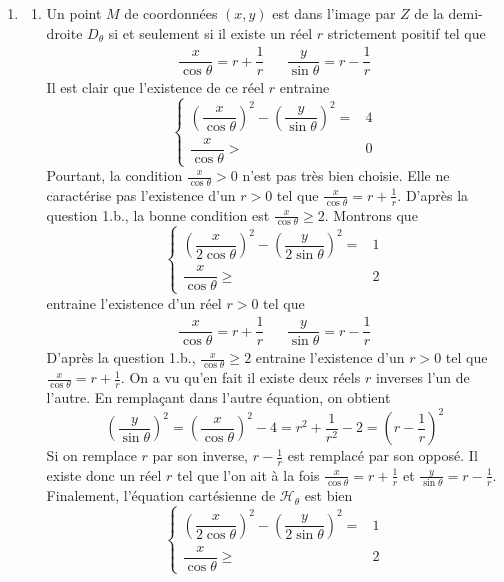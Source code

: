 \begin{enumerate}
\item 
\begin{enumerate}
 \item Un point $M$ de coordonnées $(x,y)$ est dans l'image par $Z$ de la demi-droite $D_\theta$ si et seulement si il existe un réel $r$ strictement positif tel que
\begin{align*}
 \dfrac{x}{\cos \theta}=r+\dfrac{1}{r} & & \dfrac{y}{\sin \theta}=r-\dfrac{1}{r}
\end{align*}
Il est clair que l'existence de ce réel $r$ entraine
\begin{displaymath}
 \left\lbrace 
\begin{aligned}
 \left( \dfrac{x}{\cos \theta}\right)^2 - \left( \dfrac{y}{\sin \theta}\right)^2 =& 4 \\
  \dfrac{x}{\cos \theta} >& 0
\end{aligned}
\right. 
\end{displaymath}
Pourtant, la condition $\frac{x}{\cos \theta} > 0$ n'est pas très bien choisie. Elle ne caractérise pas l'existence d'un $r>0$ tel que $\frac{x}{\cos \theta}=r+\frac{1}{r}$.\newline
D'après la question 1.b., la bonne condition est $\frac{x}{\cos \theta}\geq2$.\newline
Montrons que
\begin{displaymath}
 \left\lbrace 
\begin{aligned}
 \left( \dfrac{x}{2\cos \theta}\right)^2 - \left( \dfrac{y}{2\sin \theta}\right)^2 =& 1 \\
  \dfrac{x}{\cos \theta} \geq& 2
\end{aligned}
\right. 
\end{displaymath}
entraine l'existence d'un réel $r>0$ tel que 
\begin{align*}
 \dfrac{x}{\cos \theta}=r+\dfrac{1}{r} & & \dfrac{y}{\sin \theta}=r-\dfrac{1}{r}
\end{align*}
D'après la question 1.b., $\frac{x}{\cos \theta}\geq2$ entraine l'existence d'un $r>0$ tel que $\frac{x}{\cos \theta}=r+\frac{1}{r}$. On a vu qu'en fait il existe deux réels $r$ inverses l'un de l'autre. En remplaçant dans l'autre équation, on obtient
\begin{displaymath}
 \left( \dfrac{y}{\sin \theta}\right)^2 = 
\left( \dfrac{x}{\cos \theta}\right)^2 -4 =
r^2 + \dfrac{1}{r^2}-2=\left(r -\dfrac{1}{r} \right)^2 
\end{displaymath}
Si on remplace $r$ par son inverse, $r -\frac{1}{r}$ est remplacé par son opposé. Il existe donc un réel $r$ tel que l'on ait à la fois $\frac{x}{\cos \theta}=r+\frac{1}{r}$ et $\frac{y}{\sin \theta}=r-\frac{1}{r}$.\newline
Finalement, l'équation cartésienne de $\mathcal H_\theta$ est bien
\begin{displaymath}
 \left\lbrace 
\begin{aligned}
 \left( \dfrac{x}{2\cos \theta}\right)^2 - \left( \dfrac{y}{2\sin \theta}\right)^2 =& 1 \\
  \dfrac{x}{\cos \theta} \geq& 2
\end{aligned}
\right. 
\end{displaymath}


\end{enumerate}
\end{enumerate}
